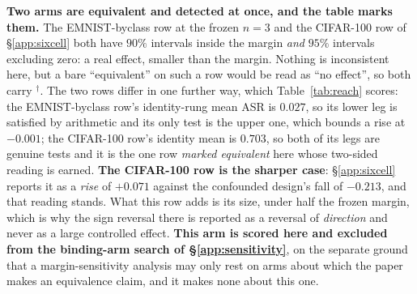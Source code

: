 \documentclass{article}
\begin{document}
\noindent \textbf{Two arms are equivalent and detected at once, and the table marks them.} The
EMNIST-byclass row at the frozen $n{=}3$ and the CIFAR-100 row of §\ref{app:sixcell} both have $90\%$
intervals inside the margin \emph{and} $95\%$ intervals excluding zero: a real effect, smaller than the
margin. Nothing is inconsistent here, but a bare ``equivalent'' on such a row would be read as ``no
effect'', so both carry $^{\dagger}$. The two rows differ in one further way, which Table~\ref{tab:reach} scores: the
EMNIST-byclass row's identity-rung mean ASR is $0.027$, so its lower leg is satisfied by arithmetic and its
only test is the upper one, which bounds a rise at $-0.001$; the CIFAR-100 row's identity mean is $0.703$, so
both of its legs are genuine tests and it is the one row \emph{marked equivalent} here whose two-sided
reading is earned.
\textbf{The CIFAR-100 row is the sharper case}: §\ref{app:sixcell}
reports it as a \emph{rise} of $+0.071$ against the confounded design's fall of $-0.213$, and that
reading stands. What this row adds is its size, under half the frozen margin, which is why the
sign reversal there is reported as a reversal of \emph{direction} and never as a large controlled
effect. \textbf{This arm is scored here and excluded from the binding-arm search of §\ref{app:sensitivity}},
on the separate ground that a margin-sensitivity analysis may only rest on arms about which the paper
makes an equivalence claim, and it makes none about this one.
\end{document}
